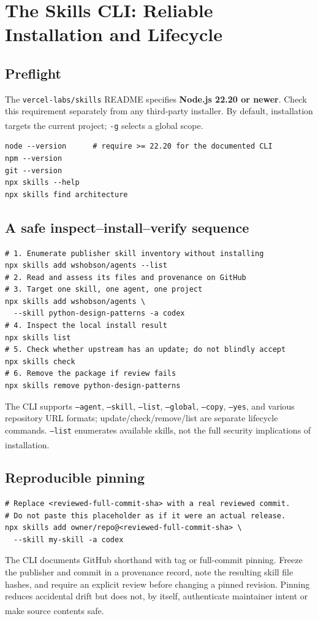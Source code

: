 \documentclass[11pt,letterpaper]{article}
\newcommand{\src}[1]{\textsuperscript{\textcolor{teal}{\cite{#1}}}}
\newcommand{\repo}[1]{\texttt{#1}}
\begin{document}
\section{The Skills CLI: Reliable Installation and Lifecycle}
\subsection{Preflight}
The \repo{vercel-labs/skills} README specifies \textbf{Node.js 22.20 or newer}. Check this requirement separately from any third-party installer. By default, installation targets the current project; \texttt{-g} selects a global scope.\src{vercelcli,vercelcommands}
\begin{verbatim}
node --version      # require >= 22.20 for the documented CLI
npm --version
git --version
npx skills --help
npx skills find architecture
\end{verbatim}
\subsection{A safe inspect--install--verify sequence}
\begin{verbatim}
# 1. Enumerate publisher skill inventory without installing
npx skills add wshobson/agents --list
# 2. Read and assess its files and provenance on GitHub
# 3. Target one skill, one agent, one project
npx skills add wshobson/agents \
  --skill python-design-patterns -a codex
# 4. Inspect the local install result
npx skills list
# 5. Check whether upstream has an update; do not blindly accept
npx skills check
# 6. Remove the package if review fails
npx skills remove python-design-patterns
\end{verbatim}
The CLI supports \texttt{--agent}, \texttt{--skill}, \texttt{--list}, \texttt{--global}, \texttt{--copy}, \texttt{--yes}, and various repository URL formats; update/check/remove/list are separate lifecycle commands. \texttt{--list} enumerates available skills, not the full security implications of installation.\src{vercelcommands}

\subsection{Reproducible pinning}
\begin{verbatim}
# Replace <reviewed-full-commit-sha> with a real reviewed commit.
# Do not paste this placeholder as if it were an actual release.
npx skills add owner/repo@<reviewed-full-commit-sha> \
  --skill my-skill -a codex
\end{verbatim}
The CLI documents GitHub shorthand with tag or full-commit pinning. Freeze the publisher and commit in a provenance record, note the resulting skill file hashes, and require an explicit review before changing a pinned revision. Pinning reduces accidental drift but does not, by itself, authenticate maintainer intent or make source contents safe.\src{vercelcommands}
\end{document}
